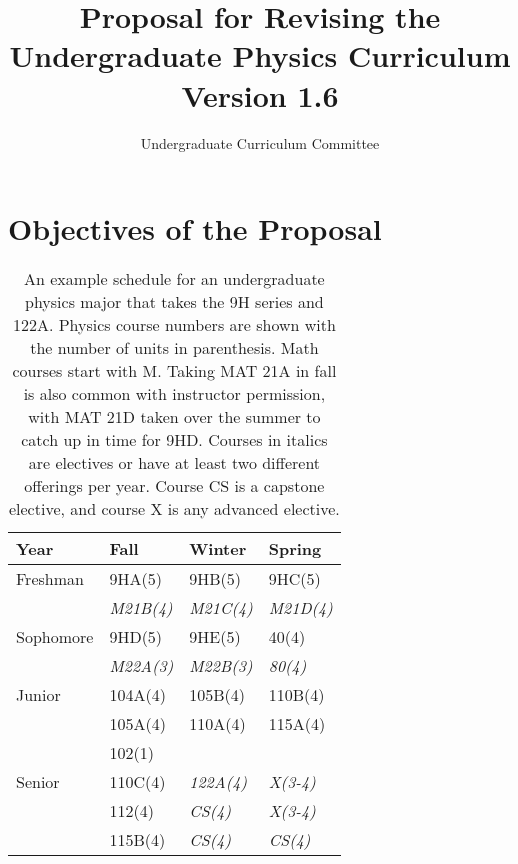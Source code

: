 \documentclass[12pt]{article}
\begin{document}

\title{Proposal for Revising the \\ Undergraduate Physics Curriculum \\ Version 1.6}
\author{Undergraduate Curriculum Committee}

\maketitle

\section{Objectives of the Proposal}

\begin{table}
\caption{An example schedule for an undergraduate physics major that takes the 9H series and 122A. Physics course numbers are shown with the number of units in parenthesis.  Math courses start with M.  Taking MAT 21A in fall is also common with instructor permission, with MAT 21D taken over the summer to catch up in time for 9HD.  Courses in italics are electives or have at least two different offerings per year. Course CS is a capstone elective, and course X is any advanced elective.}

\label{tbl:current-honors}
\begin{center}
\begin{tabular}{|l|l|l|l|}
\hline
Year      & Fall    & Winter & Spring \\
\hline
Freshman  & 9HA(5)     & 9HB(5)     & 9HC(5) \\
          & {\it M21B(4)}  & {\it M21C(4)}  & {\it M21D(4)} \\
\hline
Sophomore & 9HD(5)     & 9HE(5)     & 40(4)     \\
          & {\it M22A(3)}     & {\it M22B(3)} & {\it 80(4)} \\
\hline
Junior    & 104A(4) & 105B(4) & 110B(4)\\
          & 105A(4) & 110A(4) & 115A(4)\\
          & 102(1)  &    &     \\
\hline
Senior    & 110C(4) & {\it 122A(4)} & {\it X(3-4)}\\
          & 112(4)  & {\it CS(4)}   & {\it X(3-4)}\\
          & 115B(4) & {\it CS(4)}   & {\it CS(4)}\\

\hline 
\end{tabular}
\end{center}
\end{table}
\end{document}
